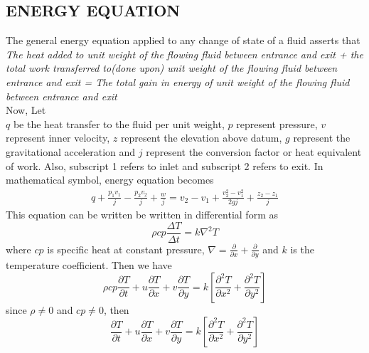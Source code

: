 \documentclass[11pt]{report}
\newcommand{\sps}{\\[0.2cm]}
\newcommand{\dsp}{\displaystyle}
\begin{document}
	\subsection{ENERGY EQUATION}
	The general energy equation applied to any change of state of a fluid asserts that\\
	\textit{The heat added to unit weight of the flowing fluid between entrance and exit + the total work transferred to(done upon) unit weight of the flowing fluid between entrance and exit = The total gain in energy of unit weight of the flowing fluid between entrance and exit}\sps
	Now, Let\\
	$q$ be the heat transfer to the fluid per unit weight, $p$ represent pressure, $v$ represent inner velocity, $z$ represent the elevation above datum, $g$ represent the gravitational acceleration and $j$ represent the conversion factor or heat equivalent of work. Also, subscript 1 refers to inlet and subscript 2 refers to exit. In mathematical symbol, energy equation becomes
	\begin{eqnarray}
		q + \frac{p_1v_1}{j} - \frac{p_2v_2}{j} + \frac{w}{j} = v_2-v_1+\frac{v_2^2 - v_1^2}{2gj} + \frac{z_2 - z_1}{j}
	\end{eqnarray}
	This equation can be written be written in differential form as
	\begin{equation}
		\rho cp\frac{\Delta T}{\Delta t} = k\nabla^2 T
	\end{equation}
	where $cp$ is specific heat at constant pressure, $\dsp\nabla = \frac{\partial}{\partial x} + \frac{\partial}{\partial y}$ and $k$ is the temperature coefficient. Then we have
	\begin{equation}
		\rho cp\frac{\partial T}{\partial t} + u\frac{\partial T}{\partial x} + v\frac{\partial T}{\partial y} = k\left[\frac{\partial^2 T}{\partial x^2} + \frac{\partial^2 T}{\partial y^2}\right]
	\end{equation}
	since $\rho \neq 0$ and $cp\neq 0$, then
	\begin{equation}
		\frac{\partial T}{\partial t} + u\frac{\partial T}{\partial x}+ v \frac{\partial T}{\partial y} = k\left[\frac{\partial^2 T}{\partial x^2} + \frac{\partial^2 T}{\partial y^2}\right]
	\end{equation}
\end{document}
